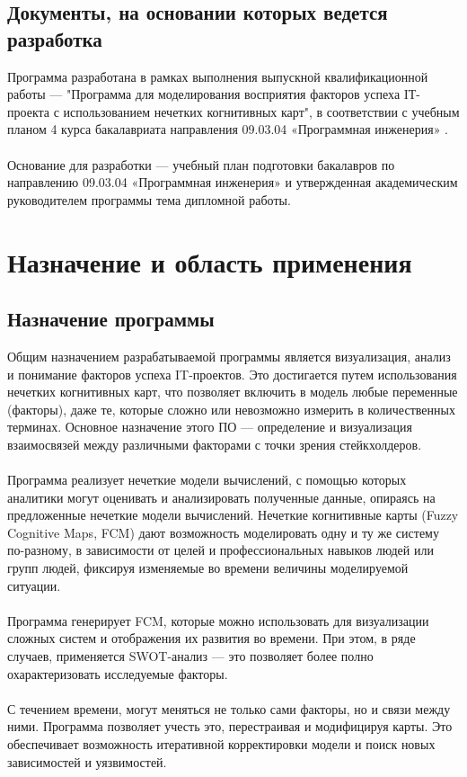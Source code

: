 \documentclass{article}
\begin{document}
    \subsection {Документы, на основании которых ведется разработка}
    Программа разработана в рамках выполнения выпускной квалификационной работы — "{}Программа для моделирования восприятия факторов успеха IТ-проекта с использованием нечетких когнитивных карт"{}, в соответствии с учебным планом 4 курса бакалавриата направления 09.03.04  «Программная инженерия» \cite{litlink10}.\\
    ~\\
    Основание для разработки — учебный план подготовки бакалавров по направлению 09.03.04 «Программная инженерия» \cite{litlink11} и утвержденная академическим руководителем программы тема дипломной работы.
    \newpage
    \section {Назначение и область применения}
    \subsection {Назначение программы}
    Общим назначением разрабатываемой программы является визуализация, анализ и понимание факторов успеха IT-проектов. Это достигается путем использования нечетких когнитивных карт, что позволяет включить в модель любые переменные (факторы), даже те, которые сложно или невозможно измерить в количественных терминах.  Основное назначение этого ПО — определение и визуализация взаимосвязей между различными факторами с точки зрения стейкхолдеров.\\
    ~\\
    Программа реализует нечеткие модели вычислений, с помощью которых аналитики могут оценивать и анализировать полученные данные, опираясь на предложенные нечеткие модели вычислений. Нечеткие когнитивные карты (Fuzzy Cognitive Maps, FCM) дают возможность моделировать одну и ту же систему по-разному, в зависимости от целей и профессиональных навыков людей или групп людей, фиксируя изменяемые во времени величины моделируемой ситуации.\\
    ~\\
    Программа генерирует FCM, которые можно использовать для визуализации сложных систем и отображения их развития во времени. При этом, в ряде случаев, применяется SWOT-анализ — это позволяет более полно охарактеризовать исследуемые факторы.\\
    ~\\
    С течением времени, могут меняться не только сами факторы, но и связи между ними. Программа позволяет учесть это, перестраивая и модифицируя карты. Это обеспечивает возможность итеративной корректировки модели и поиск новых зависимостей и уязвимостей.\\
\end{document}
